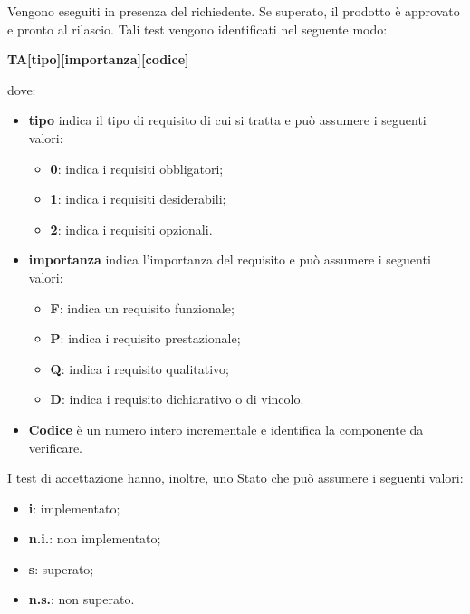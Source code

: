             Vengono eseguiti in presenza del richiedente. Se superato, il prodotto è approvato e pronto al rilascio.
            Tali test vengono identificati nel seguente modo:
                \begin{center}\textbf{TA[tipo][importanza][codice]}\end{center}
            dove:
                \begin{itemize}
                    \item \textbf{tipo} indica il tipo di requisito di cui si tratta e può assumere i seguenti valori:
                        \begin{itemize}
                            \item \textbf{0}: indica i requisiti obbligatori;
                            \item \textbf{1}: indica i requisiti desiderabili;
                            \item \textbf{2}: indica i requisiti opzionali.
                        \end{itemize}
                    \item \textbf{importanza} indica l'importanza del requisito e può assumere i seguenti valori:
                        \begin{itemize}
                            \item \textbf{F}: indica un requisito funzionale;
                            \item \textbf{P}: indica i requisito prestazionale;
                            \item \textbf{Q}: indica i requisito qualitativo;
                            \item \textbf{D}: indica i requisito dichiarativo o di vincolo.
                        \end{itemize} 
                    \item \textbf{Codice} è un numero intero incrementale e identifica la componente da verificare.         
                \end{itemize}
            I test di accettazione hanno, inoltre, uno Stato che può assumere i seguenti valori:
                \begin{itemize}
                    \item \textbf{i}: implementato;
                    \item \textbf{n.i.}: non implementato;
                    \item \textbf{s}: superato;
                    \item \textbf{n.s.}: non superato. 
                \end{itemize}

